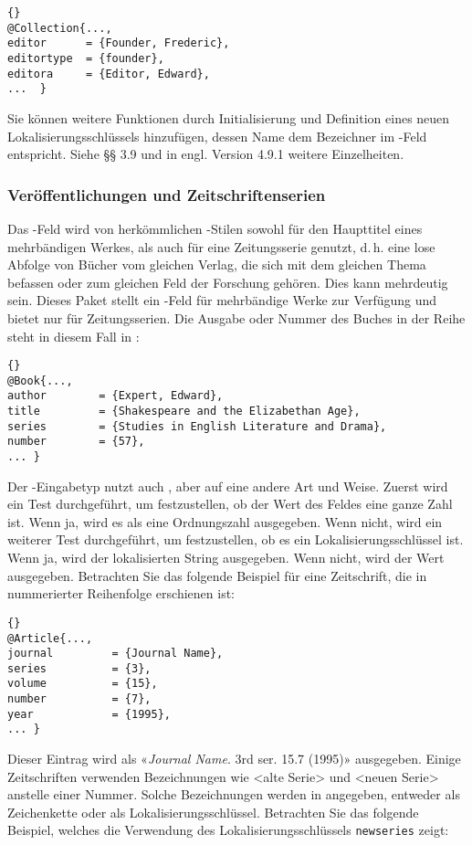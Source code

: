 \documentclass{ltxdockit}[2011/03/25]
\begin{document}
\begin{lstlisting}[style=bibtex]{} 
@Collection{..., 
editor      = {Founder, Frederic}, 
editortype  = {founder}, 
editora     = {Editor, Edward}, 
...  }
\end{lstlisting}
%
Sie können weitere Funktionen  durch Initialisierung und Definition eines neuen
Lokalisierungsschlüssels hinzufügen, dessen Name dem Bezeichner im
-Feld entspricht. Siehe %
§§ 3.9 und in engl. Version 4.9.1 weitere Einzelheiten.

\subsubsection{Veröffentlichungen und Zeitschriftenserien} \label{bib:use:ser}

Das -Feld wird von herkömmlichen \bibtex-Stilen sowohl für den
Haupttitel eines mehrbändigen Werkes, als auch für eine Zeitungsserie genutzt,
d.\,h. eine lose Abfolge von Bücher vom gleichen Verlag, die sich mit dem
gleichen Thema befassen oder zum gleichen Feld der Forschung gehören. Dies kann
mehrdeutig sein. Dieses Paket stellt ein -Feld für
mehrbändige Werke zur Verfügung und bietet  nur für
Zeitungsserien. Die Ausgabe oder Nummer des Buches in der Reihe steht in diesem
Fall in :

\begin{lstlisting}[style=bibtex]{} 
@Book{..., 
author        = {Expert, Edward},
title         = {Shakespeare and the Elizabethan Age}, 
series        = {Studies in English Literature and Drama}, 
number        = {57}, 
... }
\end{lstlisting}
%
Der -Eingabetyp nutzt auch  , aber auf eine
andere Art und Weise. Zuerst wird ein Test durchgeführt, um festzustellen, ob
der Wert des Feldes eine ganze Zahl ist. Wenn ja, wird es als eine Ordnungszahl
ausgegeben. Wenn nicht, wird ein weiterer Test durchgeführt, um festzustellen,
ob es ein Lokalisierungsschlüssel ist. Wenn ja, wird der lokalisierten String
ausgegeben. Wenn nicht, wird der Wert ausgegeben. Betrachten Sie das folgende
Beispiel für eine Zeitschrift, die in nummerierter Reihenfolge erschienen ist:

\begin{lstlisting}[style=bibtex]{} 
@Article{..., 
journal         = {Journal Name}, 
series          = {3}, 
volume          = {15}, 
number          = {7},
year            = {1995}, 
... }
\end{lstlisting}
%
Dieser Eintrag wird als «\emph{Journal Name}. 3rd ser. 15.7 (1995)» ausgegeben.
Einige Zeitschriften verwenden Bezeichnungen wie <alte Serie> und <neuen Serie>
anstelle einer Nummer. Solche Bezeichnungen werden in 
angegeben, entweder als Zeichenkette oder als Lokalisierungsschlüssel.
Betrachten Sie das folgende Beispiel, welches die Verwendung des
Lokalisierungsschlüssels \texttt{newseries} zeigt:
\end{document}
